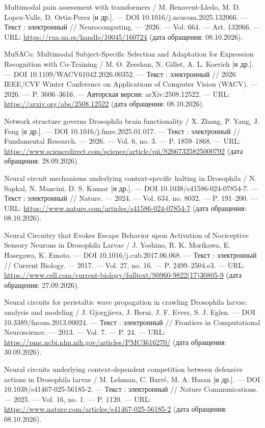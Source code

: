 \begin{list}{}{\setlength{\leftmargin}{10mm}\setlength{\labelwidth}{8mm}\setlength{\labelsep}{2mm}\setlength{\itemsep}{0pt}\setlength{\parsep}{0pt}\setlength{\topsep}{0pt}}
\item[191.] Multimodal pain assessment with transformers / M. Benavent-Lledo, M. D. Lopez-Valle, D. Ortiz-Perez [и др.]. — DOI 10.1016/j.neucom.2025.132066. — Текст : электронный // Neurocomputing. — 2026. — Vol. 664. — Art. 132066. — URL: \url{https://rua.ua.es/handle/10045/160724} (дата обращения: 08.10.2026).
\item[192.] MuSACo: Multimodal Subject-Specific Selection and Adaptation for Expression Recognition with Co-Training / M. O. Zeeshan, N. Gillet, A. L. Koerich [и др.]. — DOI 10.1109/WACV61042.2026.00352. — Текст : электронный // 2026 IEEE/CVF Winter Conference on Applications of Computer Vision (WACV). — 2026. — P. 3606–3616. — Авторская версия: arXiv:2508.12522. — URL: \url{https://arxiv.org/abs/2508.12522} (дата обращения: 08.10.2026).
\item[193.] Network structure governs Drosophila brain functionality / X. Zhang, P. Yang, J. Feng [и др.]. — DOI 10.1016/j.fmre.2025.01.017. — Текст : электронный // Fundamental Research. — 2026. — Vol. 6, no. 3. — P. 1859–1868. — URL: \url{https://www.sciencedirect.com/science/article/pii/S2667325825000792} (дата обращения: 28.09.2026).
\item[194.] Neural circuit mechanisms underlying context-specific halting in Drosophila / N. Sapkal, N. Mancini, D. S. Kumar [и др.]. — DOI 10.1038/s41586-024-07854-7. — Текст : электронный // Nature. — 2024. — Vol. 634, no. 8032. — P. 191–200. — URL: \url{https://www.nature.com/articles/s41586-024-07854-7} (дата обращения: 08.10.2026).
\item[195.] Neural Circuitry that Evokes Escape Behavior upon Activation of Nociceptive Sensory Neurons in Drosophila Larvae / J. Yoshino, R. K. Morikawa, E. Hasegawa, K. Emoto. — DOI 10.1016/j.cub.2017.06.068. — Текст : электронный // Current Biology. — 2017. — Vol. 27, no. 16. — P. 2499–2504.e3. — URL: \url{https://www.cell.com/current-biology/fulltext/S0960-9822(17)30805-9} (дата обращения: 27.09.2026).
\item[196.] Neural circuits for peristaltic wave propagation in crawling Drosophila larvae: analysis and modeling / J. Gjorgjieva, J. Berni, J. F. Evers, S. J. Eglen. — DOI 10.3389/fncom.2013.00024. — Текст : электронный // Frontiers in Computational Neuroscience. — 2013. — Vol. 7. — P. 24. — URL: \url{https://pmc.ncbi.nlm.nih.gov/articles/PMC3616270/} (дата обращения: 30.09.2026).
\item[197.] Neural circuits underlying context-dependent competition between defensive actions in Drosophila larvae / M. Lehman, C. Barré, M. A. Hasan [и др.]. — DOI 10.1038/s41467-025-56185-2. — Текст : электронный // Nature Communications. — 2025. — Vol. 16, no. 1. — P. 1120. — URL: \url{https://www.nature.com/articles/s41467-025-56185-2} (дата обращения: 08.10.2026).

\end{list}
